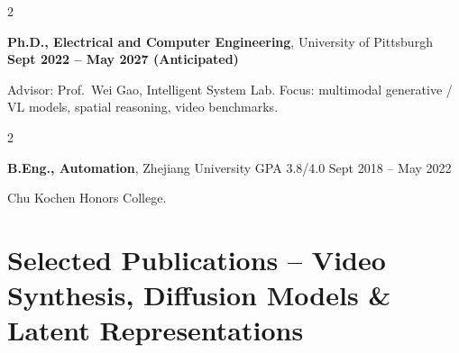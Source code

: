 \documentclass[10pt, letterpaper]{article}
\newenvironment{twocolentry}[2][]{
    \onecolentry
    \def\secondColumn{#2}
    \setcolumnwidth{\fill, 4.5cm}
    \begin{paracol}{2}
}{\switchcolumn \raggedleft \secondColumn \end{paracol} \endonecolentry}
\begin{document}
\begin{twocolentry}{\textbf{Sept 2022 -- May 2027 (Anticipated)}}
    \textbf{Ph.D., Electrical and Computer Engineering}, University of Pittsburgh
\end{twocolentry}
\vspace{-0.05cm}
{Advisor: Prof.\ Wei Gao, Intelligent System Lab. Focus: multimodal generative / VL models, spatial reasoning, video benchmarks.}

\vspace{0.18cm}

\begin{twocolentry}{Sept 2018 -- May 2022}
    \textbf{B.Eng., Automation}, Zhejiang University \hfill GPA 3.8/4.0
\end{twocolentry}
\vspace{-0.05cm}
{Chu Kochen Honors College.}

\section{Selected Publications -- Video Synthesis, Diffusion Models \& Latent Representations}
\end{document}
